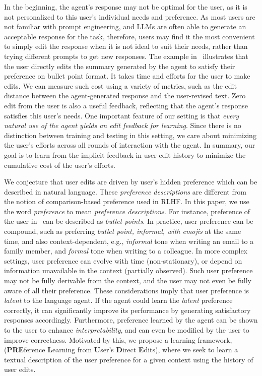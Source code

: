 In the beginning, the agent's response may not be optimal for the user, as it is not personalized to this user's individual needs and preference. As most users are not familiar with prompt engineering, and LLMs are often able to generate an acceptable response for the task, therefore, users may find it the most convenient to simply edit the response when it is not ideal to suit their needs, rather than trying different prompts to get new responses. The example in~ illustrates that the user directly edits the summary generated by the agent to satisfy their preference on bullet point format. It takes time and efforts for the user to make edits. We can measure such cost using a variety of metrics, such as the edit distance between the agent-generated response and the user-revised text. Zero edit from the user is also a useful feedback, reflecting that the agent's response satisfies this user's needs. One important feature of our setting is that \emph{every natural use of the agent yields an edit feedback for learning}. Since there is no distinction between training and testing in this setting, we care about minimizing the user's efforts across all rounds of interaction with the agent.
In summary, our goal is to learn from the implicit feedback in user edit history to minimize the cumulative cost of the user's efforts.

We conjecture that user edits are driven by user's hidden preference which can be described in natural language. These \emph{preference descriptions} are different from the notion of comparison-based preference used in RLHF. In this paper, we use the word \emph{preference} to mean \emph{preference descriptions}. For instance, preference of the user in~ can be described as \emph{bullet points}. In practice, user preference can be compound, such as preferring \emph{bullet point, informal, with emojis} at the same time, and also context-dependent, e.g., \emph{informal} tone when writing an email to a family member, and \emph{formal} tone when writing to a colleague. In more complex settings, user preference can evolve with time (non-stationary), or depend on information unavailable in the context (partially observed). Such user preference may not be fully derivable from the context, and the user may not even be fully aware of all their preference. These considerations imply that user preference is \emph{latent} to the language agent. If the agent could learn the \emph{latent} preference correctly, it can significantly improve its performance by generating satisfactory responses accordingly. Furthermore, preference learned by the agent can be shown to the user to enhance \emph{interpretability}, and can even be modified by the user to improve correctness. Motivated by this, we propose a learning framework, \textbf{\framework} (\textbf{PRE}ference \textbf{L}earning from \textbf{U}ser's \textbf{D}irect \textbf{E}dits), where we seek to learn a textual description of the user preference for a given context using the history of user edits.

